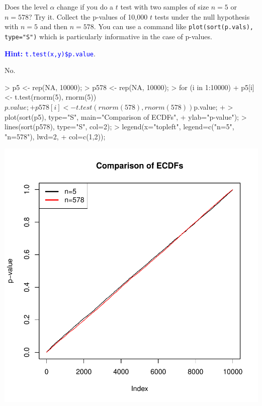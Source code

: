 \documentclass[a4paper]{article}
\theoremstyle{definition}
\begin{document}
\begin{Exercise}
Does the level $\alpha$ change if you do a $t$ test with two
samples of size $n=5$ or $n=578$? Try it. Collect the p-values
of 10,000 $t$ tests under the null hypothesis with $n = 5$ and
then $n = 578$. You can use a command like
\texttt{plot(sort(p.vals), type="S")} which is particularly
informative in the case of p-values.
\par\noindent\textcolor{Blue}{\textbf{Hint:} 
\texttt{t.test(x,y)\$p.value}}.
\end{Exercise}
\begin{Answer}
No.
\begin{Schunk}
\begin{Sinput}
> p5 <- rep(NA, 10000);
> p578 <- rep(NA, 10000);
> for (i in 1:10000) {
+   p5[i] <- t.test(rnorm(5), rnorm(5))$p.value;
+   p578[i] <- t.test(rnorm(578), rnorm(578))$p.value;
+ }
> plot(sort(p5), type="S", main="Comparison of ECDFs",
+    ylab="p-value");
> lines(sort(p578), type="S", col=2);
> legend(x="topleft", legend=c("n=5", "n=578"), lwd=2,
+    col=c(1,2));
\end{Sinput}
\end{Schunk}
\includegraphics{multipletesting-001}
\end{Answer}
\end{document}
